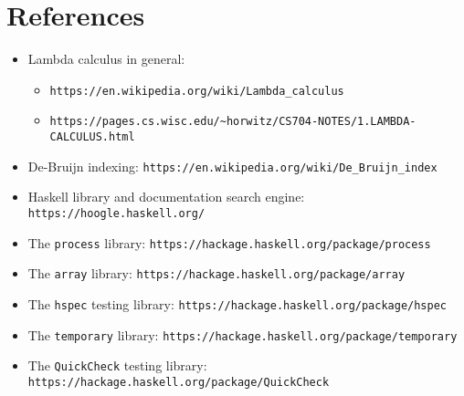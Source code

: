 \documentclass[12pt]{article}
\begin{document}
\section{References}
\begin{itemize}
    \item Lambda calculus in general:
        \small\begin{itemize}
        \item\verb$https://en.wikipedia.org/wiki/Lambda_calculus $
        \item\verb$https://pages.cs.wisc.edu/~horwitz/CS704-NOTES/1.LAMBDA-CALCULUS.html $
        \normalsize\end{itemize}
    \item De-Bruijn indexing:
        \small
        \verb$https://en.wikipedia.org/wiki/De_Bruijn_index $
        \normalsize
    \item Haskell library and documentation search engine:
        \small
        \verb$https://hoogle.haskell.org/ $
        \normalsize
    \item The \verb$process$ library:
        \small
        \verb$https://hackage.haskell.org/package/process $
        \normalsize
    \item The \verb$array$ library:
        \small
        \verb$https://hackage.haskell.org/package/array $
        \normalsize
    \item The \verb$hspec$ testing library:
        \small
        \verb$https://hackage.haskell.org/package/hspec $
        \normalsize
    \item The \verb$temporary$ library:
        \small
        \verb$https://hackage.haskell.org/package/temporary $
        \normalsize
    \item The \verb$QuickCheck$ testing library: \\
        \small
        \verb$https://hackage.haskell.org/package/QuickCheck $
        \normalsize
\end{itemize}
\end{document}
